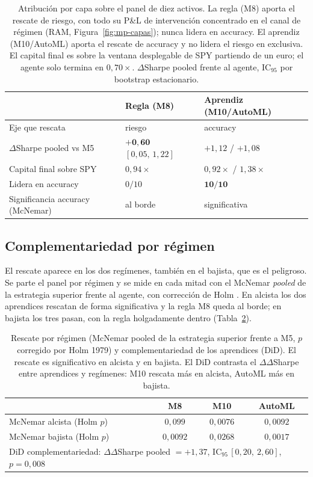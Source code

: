 \begin{table}[htbp]
\centering
\caption{Atribución por capa sobre el panel de diez activos. La regla (M8) aporta el rescate de riesgo, con todo su P\&L de intervención concentrado en el canal de régimen (RAM, Figura~\ref{fig:mp-capas}); nunca lidera en accuracy. El aprendiz (M10/AutoML) aporta el rescate de accuracy y no lidera el riesgo en exclusiva. El capital final es sobre la ventana desplegable de SPY partiendo de un euro; el agente solo termina en $0{,}70\times$. $\Delta$Sharpe pooled frente al agente, IC$_{95}$ por bootstrap estacionario.}
\label{tab:mp-capas}
\begin{tabular}{lll}
\toprule
 & Regla (M8) & Aprendiz (M10/AutoML) \\
\midrule
Eje que rescata & riesgo & accuracy \\
$\Delta$Sharpe pooled vs M5 & $\mathbf{+0{,}60}$ $[0{,}05,\,1{,}22]$ & $+1{,}12$ / $+1{,}08$ \\
Capital final sobre SPY & $0{,}94\times$ & $0{,}92\times$ / $1{,}38\times$ \\
Lidera en accuracy & $0/10$ & $\mathbf{10/10}$ \\
Significancia accuracy (McNemar) & al borde & significativa \\
\bottomrule
\end{tabular}
\end{table}

\subsection{Complementariedad por régimen}
\label{sec:panel-regimen}

El rescate aparece en los dos regímenes, también en el bajista, que es el peligroso. Se parte el panel por régimen y se mide en cada mitad con el McNemar \emph{pooled} de la estrategia superior frente al agente, con corrección de Holm \cite{holm1979}. En alcista los dos aprendices rescatan de forma significativa y la regla M8 queda al borde; en bajista los tres pasan, con la regla holgadamente dentro (Tabla~\ref{tab:mp-regimen}).

\begin{table}[htbp]
\centering
\caption{Rescate por régimen (McNemar pooled de la estrategia superior frente a M5, $p$ corregido por Holm 1979) y complementariedad de los aprendices (DiD). El rescate es significativo en alcista y en bajista. El DiD contrasta el $\Delta\Delta$Sharpe entre aprendices y regímenes: M10 rescata más en alcista, AutoML más en bajista.}
\label{tab:mp-regimen}
\begin{tabular}{lccc}
\toprule
 & M8 & M10 & AutoML \\
\midrule
McNemar alcista (Holm $p$) & $0{,}099$ & $0{,}0076$ & $0{,}0092$ \\
McNemar bajista (Holm $p$) & $0{,}0092$ & $0{,}0268$ & $0{,}0017$ \\
\midrule
\multicolumn{4}{l}{DiD complementariedad: $\Delta\Delta$Sharpe pooled $= +1{,}37$, IC$_{95}\,[0{,}20,\ 2{,}60]$, $p = 0{,}008$} \\
\bottomrule
\end{tabular}
\end{table}


